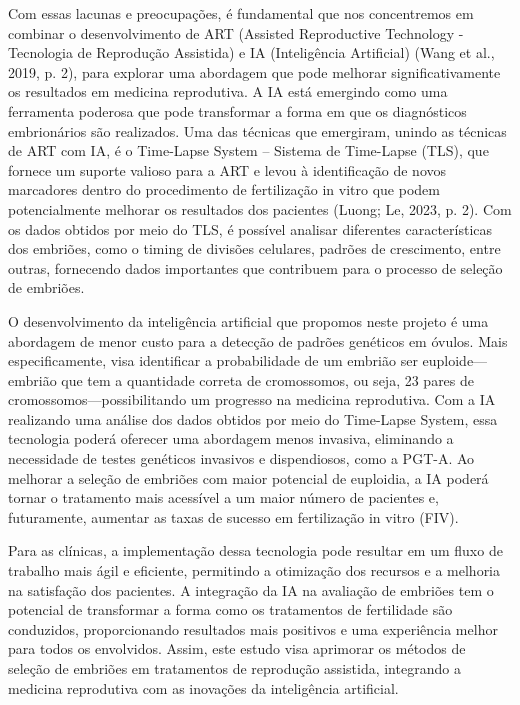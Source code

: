 Com essas lacunas e preocupações, é fundamental que nos concentremos em combinar o desenvolvimento de ART (Assisted Reproductive Technology - Tecnologia de Reprodução Assistida) e IA (Inteligência Artificial) (Wang et al., 2019, p. 2), para explorar uma abordagem que pode melhorar significativamente os resultados em medicina reprodutiva. A IA está emergindo como uma ferramenta poderosa que pode transformar a forma em que os diagnósticos embrionários são realizados. Uma das técnicas que emergiram, unindo as técnicas de ART com IA, é o Time-Lapse System – Sistema de Time-Lapse (TLS), que fornece um suporte valioso para a ART e levou à identificação de novos marcadores dentro do procedimento de fertilização in vitro que podem potencialmente melhorar os resultados dos pacientes (Luong; Le, 2023, p. 2). Com os dados obtidos por meio do TLS, é possível analisar diferentes características dos embriões, como o timing de divisões celulares, padrões de crescimento, entre outras, fornecendo dados importantes que contribuem para o processo de seleção de embriões. 

O desenvolvimento da inteligência artificial que propomos neste projeto é uma abordagem de menor custo para a detecção de padrões genéticos em óvulos. Mais especificamente, visa identificar a probabilidade de um embrião ser euploide—embrião que tem a quantidade correta de cromossomos, ou seja, 23 pares de cromossomos—possibilitando um progresso na medicina reprodutiva. Com a IA realizando uma análise dos dados obtidos por meio do Time-Lapse System, essa tecnologia poderá oferecer uma abordagem menos invasiva, eliminando a necessidade de testes genéticos invasivos e dispendiosos, como a PGT-A. Ao melhorar a seleção de embriões com maior potencial de euploidia, a IA poderá tornar o tratamento mais acessível a um maior número de pacientes e, futuramente, aumentar as taxas de sucesso em fertilização in vitro (FIV). 

Para as clínicas, a implementação dessa tecnologia pode resultar em um fluxo de trabalho mais ágil e eficiente, permitindo a otimização dos recursos e a melhoria na satisfação dos pacientes. A integração da IA na avaliação de embriões tem o potencial de transformar a forma como os tratamentos de fertilidade são conduzidos, proporcionando resultados mais positivos e uma experiência melhor para todos os envolvidos. Assim, este estudo visa aprimorar os métodos de seleção de embriões em tratamentos de reprodução assistida, integrando a medicina reprodutiva com as inovações da inteligência artificial.


